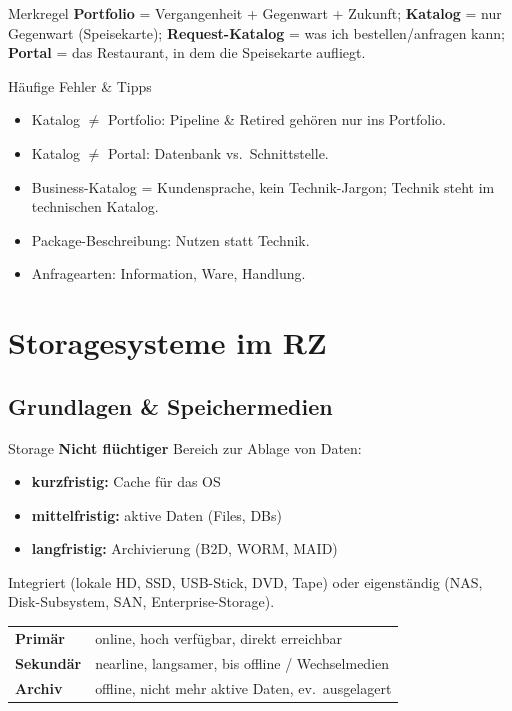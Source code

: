 \documentclass[a4paper, fontsize=7pt]{scrartcl}
\renewcommand*{\arraystretch}{1.5}  %
\begin{document}
\begin{subbox}{Merkregel}
\textbf{Portfolio} = Vergangenheit + Gegenwart + Zukunft;
\textbf{Katalog} = nur Gegenwart (Speisekarte);
\textbf{Request-Katalog} = was ich bestellen/anfragen kann;
\textbf{Portal} = das Restaurant, in dem die Speisekarte aufliegt.
\end{subbox}

\begin{subbox}{Häufige Fehler \& Tipps}
\begin{itemize}
    \item Katalog $\neq$ Portfolio: Pipeline \& Retired gehören nur ins
          Portfolio.
    \item Katalog $\neq$ Portal: Datenbank vs.\ Schnittstelle.
    \item Business-Katalog = Kundensprache, kein Technik-Jargon;
          Technik steht im technischen Katalog.
    \item Package-Beschreibung: Nutzen statt Technik.
    \item Anfragearten: Information, Ware, Handlung.
\end{itemize}
\end{subbox}

\section{Storagesysteme im RZ}

\subsection{Grundlagen \& Speichermedien}

\begin{mainbox}{Storage}
\textbf{Nicht flüchtiger} Bereich zur Ablage von Daten:
\begin{itemize}
    \item \textbf{kurzfristig:} Cache für das OS
    \item \textbf{mittelfristig:} aktive Daten (Files, DBs)
    \item \textbf{langfristig:} Archivierung (B2D, WORM, MAID)
\end{itemize}
Integriert (lokale HD, SSD, USB-Stick, DVD, Tape) oder eigenständig (NAS,
Disk-Subsystem, SAN, Enterprise-Storage).
\renewcommand*{\arraystretch}{1.15}
\begin{tabularx}{\linewidth}{@{}l|>{\raggedright\arraybackslash}X@{}}
\textbf{Primär} & online, hoch verfügbar, direkt erreichbar \\
\textbf{Sekundär} & nearline, langsamer, bis offline / Wechselmedien \\
\textbf{Archiv} & offline, nicht mehr aktive Daten, ev.\ ausgelagert \\
\end{tabularx}
\end{mainbox}
\end{document}
